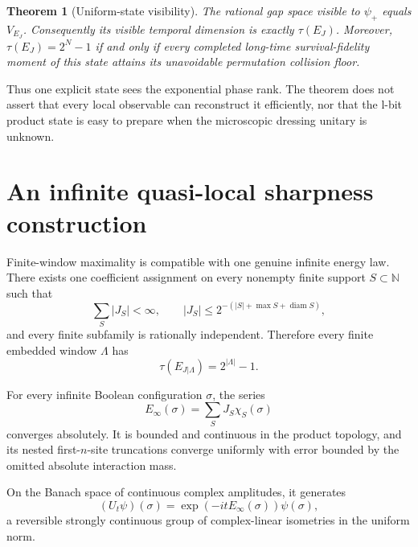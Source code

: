 \documentclass[10pt]{article}
\newtheorem{theorem}{Theorem}
\theoremstyle{definition}
\newcommand{\N}{\mathbb N}
\begin{document}
\begin{theorem}[Uniform-state visibility]
The rational gap space visible to \(\psi_+\) equals \(V_{E_J}\).
Consequently its visible temporal dimension is exactly \(\tau(E_J)\).
Moreover, \(\tau(E_J)=2^N-1\) if and only if every completed long-time
survival-fidelity moment of this state attains its unavoidable permutation
collision floor.
\end{theorem}

Thus one explicit state sees the exponential phase rank. The theorem does
not assert that every local observable can reconstruct it efficiently, nor
that the l-bit product state is easy to prepare when the microscopic
dressing unitary is unknown.

\section{An infinite quasi-local sharpness construction}

Finite-window maximality is compatible with one genuine infinite energy
law. There exists one coefficient assignment on every nonempty finite
support \(S\subset\N\) such that
\begin{equation}
 \sum_S|J_S|<\infty,\qquad
 |J_S|\le
 2^{-\left(|S|+\max S+\operatorname{diam}S\right)},
 \label{eq:envelope}
\end{equation}
and every finite subfamily is rationally independent. Therefore every
finite embedded window \(\Lambda\) has
\begin{equation}
 \tau(E_{J|\Lambda})=2^{|\Lambda|}-1.
 \label{eq:allwindows}
\end{equation}

For every infinite Boolean configuration \(\sigma\), the series
\begin{equation}
 E_\infty(\sigma)=\sum_SJ_S\chi_S(\sigma)
 \label{eq:infiniteenergy}
\end{equation}
converges absolutely. It is bounded and continuous in the product topology,
and its nested first-\(n\)-site truncations converge uniformly with error
bounded by the omitted absolute interaction mass.

On the Banach space of continuous complex amplitudes, it generates
\begin{equation}
 (U_t\psi)(\sigma)=
 \exp\!\left(-itE_\infty(\sigma)\right)\psi(\sigma),
 \label{eq:evolution}
\end{equation}
a reversible strongly continuous group of complex-linear isometries in the
uniform norm.
\end{document}
